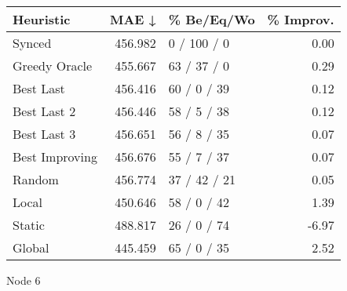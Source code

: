 \begin{tabular}{lrlr}
\toprule
\textbf{Heuristic} & \textbf{MAE ↓} & \textbf{\% Be/Eq/Wo} & \textbf{\% Improv.} \\
\midrule
            Synced &        456.982 &          0 / 100 / 0 &                0.00 \\
     Greedy Oracle &        455.667 &          63 / 37 / 0 &                0.29 \\
         Best Last &        456.416 &          60 / 0 / 39 &                0.12 \\
       Best Last 2 &        456.446 &          58 / 5 / 38 &                0.12 \\
       Best Last 3 &        456.651 &          56 / 8 / 35 &                0.07 \\
    Best Improving &        456.676 &          55 / 7 / 37 &                0.07 \\
            Random &        456.774 &         37 / 42 / 21 &                0.05 \\
             Local &        450.646 &          58 / 0 / 42 &                1.39 \\
            Static &        488.817 &          26 / 0 / 74 &               -6.97 \\
            Global &        445.459 &          65 / 0 / 35 &                2.52 \\
\bottomrule
\end{tabular}
\caption{Node 6}
\label{tab:non_lr01_le1_bs2_6}
